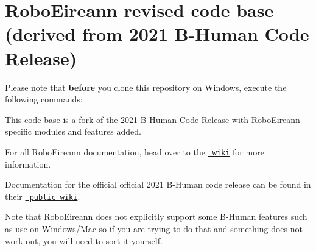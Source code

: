 \chapter{Robo\+Eireann revised code base (derived from 2021 B-\/\+Human Code Release)}
\hypertarget{md__r_e_a_d_m_e}{}\label{md__r_e_a_d_m_e}
\label{md__r_e_a_d_m_e_autotoc_md0}%
%
 Please note that {\bfseries{before}} you clone this repository on Windows, execute the following commands\+:


\begin{DoxyCode}{0}

\end{DoxyCode}


This code base is a fork of the 2021 B-\/\+Human Code Release with Robo\+Eireann specific modules and features added.

For all Robo\+Eireann documentation, head over to the \href{https://github.com/roboeireann/rematch/wiki}{\texttt{ wiki}} for more information.

Documentation for the official official 2021 B-\/\+Human code release can be found in their \href{https://wiki.b-human.de/coderelease2021/}{\texttt{ public wiki}}.

Note that Robo\+Eireann does not explicitly support some B-\/\+Human features such as use on Windows/\+Mac so if you are trying to do that and something does not work out, you will need to sort it yourself. 